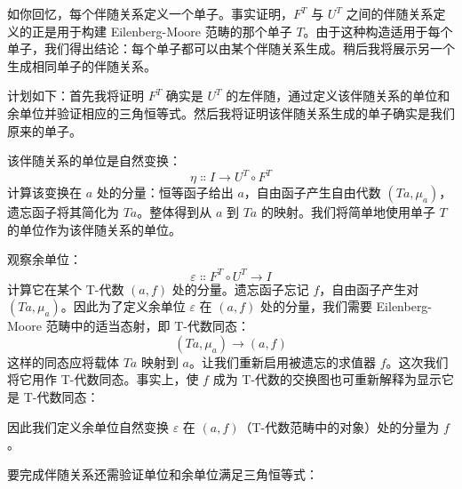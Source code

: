 如你回忆，每个伴随关系定义一个单子。事实证明，$F^T$ 与 $U^T$ 之间的伴随关系定义的正是用于构建 Eilenberg-Moore 范畴的那个单子 $T$。由于这种构造适用于每个单子，我们得出结论：每个单子都可以由某个伴随关系生成。稍后我将展示另一个生成相同单子的伴随关系。

计划如下：首先我将证明 $F^T$ 确实是 $U^T$ 的左伴随，通过定义该伴随关系的单位和余单位并验证相应的三角恒等式。然后我将证明该伴随关系生成的单子确实是我们原来的单子。

该伴随关系的单位是自然变换：
\[\eta \Colon I \to U^T \circ F^T\]
计算该变换在 $a$ 处的分量：恒等函子给出 $a$，自由函子产生自由代数 $(T a, \mu_a)$，遗忘函子将其简化为 $T a$。整体得到从 $a$ 到 $T a$ 的映射。我们将简单地使用单子 $T$ 的单位作为该伴随关系的单位。

观察余单位：
\[\varepsilon \Colon F^T \circ U^T \to I\]
计算它在某个 T-代数 $(a, f)$ 处的分量。遗忘函子忘记 $f$，自由函子产生对 $(T a, \mu_a)$。因此为了定义余单位 $\varepsilon$ 在 $(a, f)$ 处的分量，我们需要 Eilenberg-Moore 范畴中的适当态射，即 T-代数同态：
\[(T a, \mu_a) \to (a, f)\]
这样的同态应将载体 $T a$ 映射到 $a$。让我们重新启用被遗忘的求值器 $f$。这次我们将它用作 T-代数同态。事实上，使 $f$ 成为 T-代数的交换图也可重新解释为显示它是 T-代数同态：

\begin{figure}[H]
  \centering
\end{figure}

\noindent
因此我们定义余单位自然变换 $\varepsilon$ 在 $(a, f)$（T-代数范畴中的对象）处的分量为 $f$。

要完成伴随关系还需验证单位和余单位满足三角恒等式：

\begin{figure}[H]
  \centering
  \begin{subfigure}
    \centering
  \end{subfigure}%
  \hspace{1cm}
  \begin{subfigure}
    \centering
  \end{subfigure}
\end{figure}

